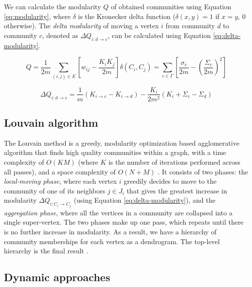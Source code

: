 We can calculate the modularity $Q$ of obtained communities using Equation \ref{eq:modularity}, where $\delta$ is the Kronecker delta function ($\delta (x,y)=1$ if $x=y$, $0$ otherwise). The \textit{delta modularity} of moving a vertex $i$ from community $d$ to community $c$, denoted as $\Delta Q_{i: d \rightarrow c}$, can be calculated using Equation \ref{eq:delta-modularity}.

\begin{equation}
\label{eq:modularity}
  Q
  = \frac{1}{2m} \sum_{(i, j) \in E} \left[w_{ij} - \frac{K_i K_j}{2m}\right] \delta(C_i, C_j)
  = \sum_{c \in \Gamma} \left[\frac{\sigma_c}{2m} - \left(\frac{\Sigma_c}{2m}\right)^2\right]
\end{equation}

\begin{equation}
\label{eq:delta-modularity}
  \Delta Q_{i: d \rightarrow c}
  = \frac{1}{m} (K_{i \rightarrow c} - K_{i \rightarrow d}) - \frac{K_i}{2m^2} (K_i + \Sigma_c - \Sigma_d)
\end{equation}




\subsection{Louvain algorithm}
\label{sec:about-louvain}

The Louvain method is a greedy, modularity optimization based agglomerative algorithm that finds high quality communities within a graph, with a time complexity of $O (KM)$ (where $K$ is the number of iterations performed across all passes), and a space complexity of $O(N + M)$ \cite{com-lancichinetti09}. It consists of two phases: the \textit{local-moving phase}, where each vertex $i$ greedily decides to move to the community of one of its neighbors $j \in J_i$ that gives the greatest increase in modularity $\Delta Q_{i:C_i \rightarrow C_j}$ (using Equation \ref{eq:delta-modularity}), and the \textit{aggregation phase}, where all the vertices in a community are collapsed into a single super-vertex. The two phases make up one pass, which repeats until there is no further increase in modularity. As a result, we have a hierarchy of community memberships for each vertex as a dendrogram. The top-level hierarchy is the final result \cite{com-leskovec21}.




\subsection{Dynamic approaches}
\label{sec:dynamic-graphs}

